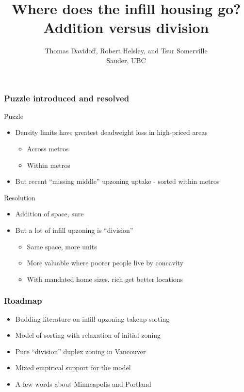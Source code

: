 \documentclass{beamer}
\begin{document}
\title{Where does the infill housing go? \\Addition versus division}
\author{Thomas Davidoff, Robert Helsley, and Tsur Somerville\\Sauder, UBC}
\frame{\titlepage}

\begin{frame}
	\frametitle{Puzzle introduced and resolved}
	\begin{block}{Puzzle}
		\begin{itemize}
			\item Density limits have greatest deadweight loss in high-priced areas
				\begin{itemize}
					\item Across metros \textcite{HsiehMoretti}
					\item Within metros \textcite{bruecknerSingh}
				\end{itemize}
			\item But recent ``missing middle'' upzoning uptake - sorted within metros
		\end{itemize}
	\end{block}
	\begin{block}{Resolution}
		\begin{itemize}
			\item Addition of space, sure
			\item But a lot of infill upzoning is ``division''
				\begin{itemize}
					\item Same space, more units
					\item More valuable where poorer people live by concavity
					\item With mandated home sizes, rich get better locations
				\end{itemize}
		\end{itemize}
	\end{block}
\end{frame}

 
\begin{frame}
	\frametitle{Roadmap}
	\begin{itemize}
		\item Budding literature on infill upzoning takeup sorting
		\item Model of sorting with relaxation of initial zoning
		\item Pure ``division'' duplex zoning in Vancouver
		\item Mixed empirical support for the model
		\item A few words about Minneapolis and Portland
	\end{itemize}
\end{frame}
\end{document}
